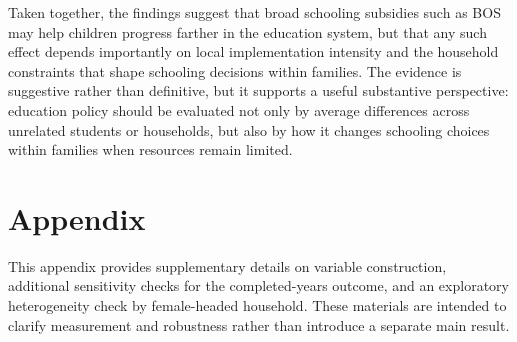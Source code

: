 \documentclass[a4paper, 12pt]{article}
\begin{document}
\begin{doublespacing}
Taken together, the findings suggest that broad schooling subsidies such as BOS may help children progress farther in the education system, but that any such effect depends importantly on local implementation intensity and the household constraints that shape schooling decisions within families. The evidence is suggestive rather than definitive, but it supports a useful substantive perspective: education policy should be evaluated not only by average differences across unrelated students or households, but also by how it changes schooling choices within families when resources remain limited.
\clearpage


\clearpage
\section*{Appendix}
\begin{singlespace}

	This appendix provides supplementary details on variable construction, additional sensitivity checks for the completed-years outcome, and an exploratory heterogeneity check by female-headed household. These materials are intended to clarify measurement and robustness rather than introduce a separate main result.

	

	

	

\end{singlespace}
\end{doublespacing}
\end{document}
